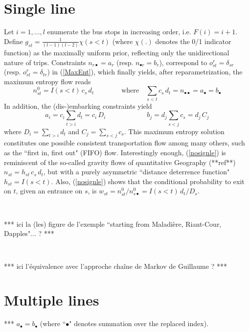 \documentclass{bmcart}
\begin{document}
{\section{Single line}
\label{Single line}
Let  $i=1,\ldots, l$ enumerate the bus stops in increasing order,  i.e. $F(i)=i+1$. Define $g_{st}=\frac{1}{(l-1)(l-2)}\chi(s<t)$ (where $\chi(.)$ denotes the 0/1  indicator function) as the maximally uniform prior, reflecting only the unidirectional nature of trips. 
Constraints $n_{r\bullet}=a_r$ (resp. $n_{\bullet r}=b_r$), correspond to $o^r_{st}=
\delta_{sr}$ (resp. $o^r_{st}=\delta_{tr}$) in (\ref{MaxEnt}), which finally yields, after reparametrization, the maximum entropy flow reads
\begin{equation}
\label{nosignle}
n^0_{st}=I(s<t)\, c_s\, d_t \qquad\qquad\mbox{where}\quad \sum_{s<t}c_s\, d_t=n_{\bullet\bullet}=a_{\bullet}=b_\bullet
\end{equation}
In addition, the (dis-)embarking constraints  yield
\begin{equation}
\label{(dis embarking constraints}
a_i=c_i \sum_{t>i}d_t=c_i\, D_i 
\qquad\qquad\qquad
b_j=d_j\sum_{s<j}c_s=d_j \, C_j  
\end{equation}
where $D_i=\sum_{t>i}d_t$ and $C_j=\sum_{s<j}c_s$. This maximum entropy solution constitutes one possible consistent transportation flow among many others, such as the ``first in, first out" (FIFO) flow. Interestingly enough, (\ref{nosignle}) is reminiscent of the so-called gravity flows of quantitative Geography (**ref**) $n_{st}=h_{st}\, c_s\, d_t $, but with a purely asymmetric ``distance deterrence function" $h_{st}=I(s<t)$.  Also, 
(\ref{nosignle}) shows that  the conditional probability to exit on $t$, given an entrance on $s$, is $w_{st}=n^0_{st}/n^0_{s\bullet}=I(s<t)\, d_t/D_s$. 


\

*** ici la (les) figure de l'exemple  ``starting from Maladière, Riant-Cour, Dapples"... ? ***

\


*** ici l'équivalence avec l'approche chaîne de Markov de Guillaume ? ***
 


\section{Multiple lines} 

*** $a_{\bullet}=b_{\bullet}$ (where ``$\bullet$" denotes summation over the replaced index). 
 
}
\end{document}
